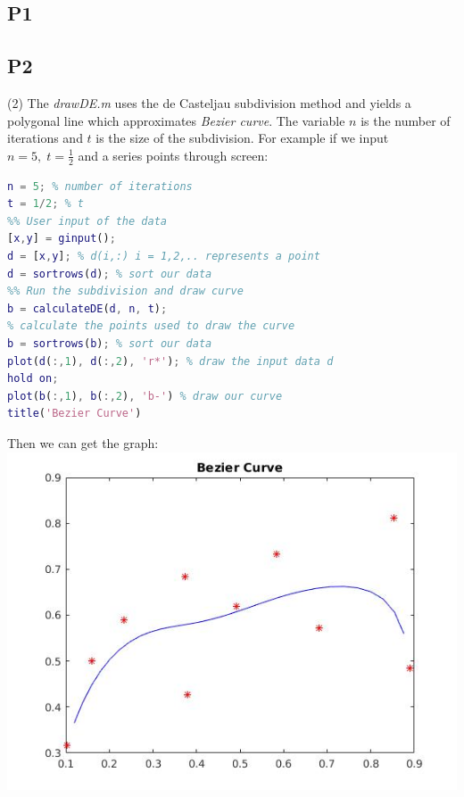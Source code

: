 \documentclass[12pt]{article}
\begin{document}
\subsection*{P1}
\subsection*{P2}
(2) 
The \textit{drawDE.m} uses the de Casteljau subdivision method and  yields a polygonal line which approximates \textit{Bezier curve}. The variable $n$ is the number of iterations and $t$ is the size of the subdivision. For example if we input $n = 5 , \; t = \frac{1}{2}$ and a series points through screen: 
\begin{lstlisting}[language=Matlab]
n = 5; % number of iterations
t = 1/2; % t 
%% User input of the data
[x,y] = ginput();  
d = [x,y]; % d(i,:) i = 1,2,.. represents a point 
d = sortrows(d); % sort our data 
%% Run the subdivision and draw curve
b = calculateDE(d, n, t); 
% calculate the points used to draw the curve 
b = sortrows(b); % sort our data 
plot(d(:,1), d(:,2), 'r*'); % draw the input data d
hold on;
plot(b(:,1), b(:,2), 'b-') % draw our curve 
title('Bezier Curve')
\end{lstlisting}
Then we can get the graph: \\
\includegraphics[scale=.5]{npoints}
\end{document}
